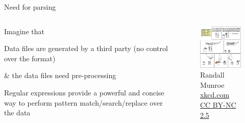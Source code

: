\documentclass[xcolor=table,10pt]{beamer}
\begin{document}
\begin{frame}{Need for parsing}
  \begin{columns}[T]
    \begin{column}{.4\textwidth}
      Imagine that
      \vspace{0.5cm}
      \begin{arrowlist}
        \itemsep8pt
        \item[]<1-> Data files are generated by a third party (no control
          over the format)
        \item[]<2-> \& the data files need pre-processing
          \vspace{0.3cm}
        \item<3-> Regular expressions provide a powerful and concise way
          to perform pattern match/search/replace over the data
      \end{arrowlist}

    \end{column}
    \begin{column}{.6\textwidth}
      \begin{figure}
        \includegraphics[width=6.4cm]{xkcd208.png}
        \caption*{\tiny  \textcopyright Randall Munroe \href{http://xkcd.com/208/}{xkcd.com} \href{http://creativecommons.org/licenses/by-nc/2.5/}{CC BY-NC 2.5}}
      \end{figure}
    \end{column}    

  \end{columns}
\end{frame}
\end{document}

